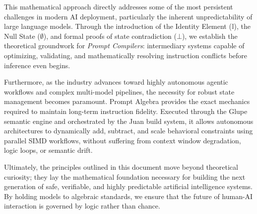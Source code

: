 \documentclass[11pt, a4paper]{article}
\begin{document}
This mathematical approach directly addresses some of the most persistent challenges in modern AI deployment, particularly the inherent unpredictability of large language models. Through the introduction of the Identity Element ($\mathbb{I}$), the Null State ($\emptyset$), and formal proofs of state contradiction ($\bot$), we establish the theoretical groundwork for \textit{Prompt Compilers}: intermediary systems capable of optimizing, validating, and mathematically resolving instruction conflicts before inference even begins. 

Furthermore, as the industry advances toward highly autonomous agentic workflows and complex multi-model pipelines, the necessity for robust state management becomes paramount. Prompt Algebra provides the exact mechanics required to maintain long-term instruction fidelity. Executed through the Glupe semantic engine and orchestrated by the Juan build system, it allows autonomous architectures to dynamically add, subtract, and scale behavioral constraints using parallel SIMD workflows, without suffering from context window degradation, logic loops, or semantic drift. 

Ultimately, the principles outlined in this document move beyond theoretical curiosity; they lay the mathematical foundation necessary for building the next generation of safe, verifiable, and highly predictable artificial intelligence systems. By holding models to algebraic standards, we ensure that the future of human-AI interaction is governed by logic rather than chance.
\end{document}
